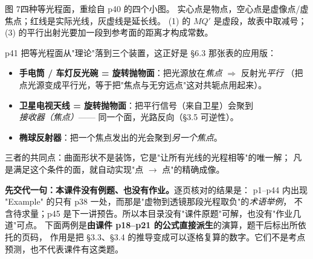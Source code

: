 \documentclass[11pt]{ctexart}
\begin{document}
\begin{center}

{\small\color{inkgray}图 7\quad 四种等光程面，重绘自 p40 的四个小图。
实心点是物点，空心点是虚像点/虚焦点；红线是实际光线，灰虚线是延长线。
(1) 的 $MQ'$ 是虚段，故表中取减号；(3) 的平行出射光要加一段到参考面的距离才构成常数。}
\end{center}


p41 把等光程面从"理论"落到三个装置，这正好是 §6.3 那张表的应用版：

\begin{itemize}
\item \textbf{手电筒 / 车灯反光碗 = 旋转抛物面}：把光源放在\emph{焦点} $\Rightarrow$ 反射光\emph{平行}
（把点光源变成平行光，等于把"焦点与无穷远点"这对共轭点用起来）。
\item \textbf{卫星电视天线 = 旋转抛物面}：把平行信号（来自卫星）会聚到\emph{接收器（焦点）}——
同一个面，光路反向（§3.5 可逆性）。
\item \textbf{椭球反射器}：把一个焦点发出的光会聚到\emph{另一个焦点}。
\end{itemize}
三者的共同点：曲面形状不是装饰，它是"让所有光线的光程相等"的唯一解；
凡是满足这个条件的面，就自动实现"点 $\to$ 点"的精确成像。

\needspace{0.20\textheight}

\textbf{先交代一句：本课件没有例题、也没有作业。}逐页核对的结果是：
p1--p44 内出现 "Example" 的只有 p38 一处，而那是"虚物到透镜那段光程取负"的\emph{术语举例}，
不含待求量；p45 是下一讲预告。所以本目录没有"课件原题"可解，也没有"作业几道"可点。
下面两例是\textbf{由课件 p18--p21 的公式直接派生}的演算，题干后标出所依托的页码，
作用是把 §3.3、§3.4 的推导变成可以逐格复算的数字。它们不是考点预测，也不代表课件有这类题。
\end{document}

